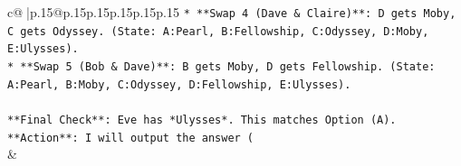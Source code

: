 \documentclass{article}
\begin{document}
{\begin{supertabular}{c@{$\;$}|p{.15\linewidth}@{}p{.15\linewidth}p{.15\linewidth}p{.15\linewidth}p{.15\linewidth}p{.15\linewidth}}
{{{\texttt{*   **Swap 4 (Dave \& Claire)**: D gets Moby, C gets Odyssey. (State: A:Pearl, B:Fellowship, C:Odyssey, D:Moby, E:Ulysses).} \\
\texttt{*   **Swap 5 (Bob \& Dave)**: B gets Moby, D gets Fellowship. (State: A:Pearl, B:Moby, C:Odyssey, D:Fellowship, E:Ulysses).} \\
\\ 
\texttt{**Final Check**: Eve has *Ulysses*. This matches Option (A).} \\
\texttt{**Action**: I will output the answer (} \\
            }
        }
    }
    & \\ \\

\end{supertabular}
}
\end{document}
